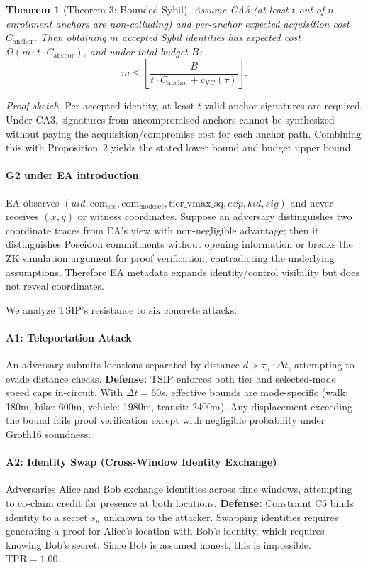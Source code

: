 \documentclass[conference]{IEEEtran}
\theoremstyle{definition}
\theoremstyle{plain}
\newtheorem{theorem}{Theorem}
\begin{document}
\begin{theorem}[Theorem 3: Bounded Sybil]
Assume CA3 (at least $t$ out of $n$ enrollment anchors are non-colluding) and
per-anchor expected acquisition cost $C_{\mathrm{anchor}}$.
Then obtaining $m$ accepted Sybil identities has expected cost
$\Omega(m\cdot t\cdot C_{\mathrm{anchor}})$, and under total budget $B$:
\[
m \le \left\lfloor \frac{B}{t\cdot C_{\mathrm{anchor}} + c_{\mathrm{VC}}(\tau)} \right\rfloor .
\]
\end{theorem}
\textit{Proof sketch.}
Per accepted identity, at least $t$ valid anchor signatures are required.
Under CA3, signatures from uncompromised anchors cannot be synthesized without
paying the acquisition/compromise cost for each anchor path. Combining this
with Proposition~2 yields the stated lower bound and budget upper bound.

\paragraph{G2 under EA introduction.}
EA observes $(uid,\mathrm{com}_{\mathrm{sec}},\mathrm{com}_{\mathrm{modeset}},
\mathrm{tier\_vmax\_sq},exp,kid,sig)$ and never receives $(x,y)$ or witness
coordinates. Suppose an adversary distinguishes two coordinate traces from EA's
view with non-negligible advantage; then it distinguishes Poseidon commitments
without opening information or breaks the ZK simulation argument for proof
verification, contradicting the underlying assumptions. Therefore EA metadata
expands identity/control visibility but does not reveal coordinates.

We analyze TSIP's resistance to six concrete attacks:

\paragraph{A1: Teleportation Attack}
An adversary submits locations separated by distance
$d > \tau_u \cdot \Delta t$, attempting to evade distance checks.
\textbf{Defense:} TSIP enforces both tier and selected-mode speed caps
in-circuit. With $\Delta t{=}60$s, effective bounds are mode-specific
(walk: 180m, bike: 600m, vehicle: 1980m, transit: 2400m). Any displacement
exceeding the bound fails proof verification except with negligible
probability under Groth16 soundness.

\paragraph{A2: Identity Swap (Cross-Window Identity Exchange)}
Adversaries Alice and Bob exchange identities across time windows, attempting to co-claim credit for presence at both locations. \textbf{Defense:} Constraint C5 binds identity to a secret $s_u$ unknown to the attacker. Swapping identities requires generating a proof for Alice's location with Bob's identity, which requires knowing Bob's secret. Since Bob is assumed honest, this is impossible. $\text{TPR} = 1.00$.
\end{document}
